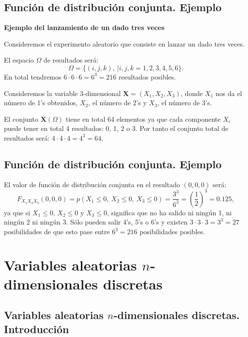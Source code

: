 \documentclass[]{book}
\begin{document}
\hypertarget{funciuxf3n-de-distribuciuxf3n-conjunta.-ejemplo-12}{%
\subsection{Función de distribución conjunta. Ejemplo}\label{funciuxf3n-de-distribuciuxf3n-conjunta.-ejemplo-12}}

\textbf{Ejemplo del lanzamiento de un dado tres veces}

Consideremos el experimento aleatorio que consiste en lanzar un dado tres veces.

El espacio \(\Omega\) de resultados será:
\[
\Omega =\{(i,j,k),\ | i,j,k=1,2,3,4,5,6\}.
\]
En total tendremos \(6\cdot 6\cdot 6=6^3=216\) resultados posibles.

Consideremos la variable 3-dimensional \(\mathbf{X}=(X_1,X_2,X_3)\), donde \(X_1\) nos da el número de 1's obtenidos, \(X_2\), el número de 2's y \(X_3\), el número de 3's.

El conjunto \(\mathbf{X}(\Omega)\) tiene en total 64 elementos ya que cada componente \(X_i\) puede tener en total 4 resultados: 0, 1, 2 o 3. Por tanto el conjunto total de resultados será: \(4\cdot 4\cdot 4=4^3=64\).

\hypertarget{funciuxf3n-de-distribuciuxf3n-conjunta.-ejemplo-13}{%
\subsection{Función de distribución conjunta. Ejemplo}\label{funciuxf3n-de-distribuciuxf3n-conjunta.-ejemplo-13}}

El valor de función de distribución conjunta en el resultado \((0,0,0)\) será:
\[
F_{X_1X_2X_3}(0,0,0)=p(X_1\leq 0,\ X_2\leq 0,\ X_3\leq 0)=\frac{3^3}{6^3}=\left(\frac{1}{2}\right)^3 =0.125,
\]
ya que si \(X_1\leq 0\), \(X_2\leq 0\) y \(X_3\leq 0\), significa que no ha salido ni ningún 1, ni ningún 2 ni ningún 3. Sólo pueden salir 4's, 5's o 6's y existen \(3\cdot 3\cdot 3=3^3=27\) posibilidades de que esto pase entre \(6^3=216\) posibilidades posibles.

\hypertarget{variables-aleatorias-n-dimensionales-discretas}{%
\section{\texorpdfstring{Variables aleatorias \(n\)-dimensionales discretas}{Variables aleatorias n-dimensionales discretas}}\label{variables-aleatorias-n-dimensionales-discretas}}

\hypertarget{variables-aleatorias-n-dimensionales-discretas.-introducciuxf3n}{%
\subsection{\texorpdfstring{Variables aleatorias \(n\)-dimensionales discretas. Introducción}{Variables aleatorias n-dimensionales discretas. Introducción}}\label{variables-aleatorias-n-dimensionales-discretas.-introducciuxf3n}}
\end{document}
